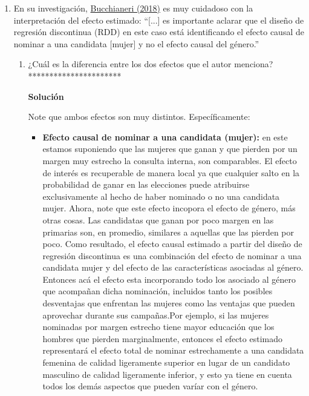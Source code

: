 \documentclass[a4paper, answers, addpoints, 11pt]{exam}
\newenvironment{solucion}{%
  \begin{mdframed}[
    backgroundcolor=blue!5,    %
    linecolor=blue!50,          %
    linewidth=2pt,              %
    leftmargin=10pt,            %
    rightmargin=8pt,           %
    topline=true,              %
    bottomline=true,            %
    roundcorner=10pt,           %
    innerleftmargin=10pt,       %
    innerrightmargin=10pt,      %
    innerbottommargin=10pt,     %
    innertopmargin=10pt         %
  ]%
  \begin{tcolorbox}[colframe=blue!50!black, colback=blue!50, coltitle=white, sharp corners=all, boxrule=1mm, width=\textwidth, halign=left, valign=center, top=0mm, bottom=0mm, left=0mm, right=0mm] \textbf{Solución} \end{tcolorbox} }{\end{mdframed}}
\begin{document}
\begin{enumerate}[resume]
\begin{enumerate}
\begin{solucion}
\end{solucion}
    \end{enumerate}
\textcolor{red}{revisar estas argumentaciones de efecto genero y de nominacion}
    \item En su investigación, \href{https://link.springer.com/article/10.1007/s11109-017-9407-7}{Bucchianeri (2018)} es muy cuidadoso con la interpretación del efecto estimado: ``[...] es importante aclarar que el diseño de regresión discontinua (RDD) en este caso está identificando el efecto causal de nominar a una candidata [mujer] y no el efecto causal del género.'' 

    \begin{enumerate}
        \item ¿Cuál es la diferencia entre los dos efectos que el autor menciona?**********************
\begin{solucion}
Note que ambos efectos son muy distintos. Específicamente:

\begin{itemize}
    \item \textbf{Efecto causal de nominar a una candidata (mujer):} en este estamos suponiendo que las mujeres que ganan  y que pierden por un margen muy estrecho la consulta interna, son comparables. El efecto de interés es recuperable de manera local ya que cualquier salto en la probabilidad de ganar en las elecciones puede atribuirse exclusivamente al hecho de haber nominado o no una candidata mujer. Ahora, note que este efecto incopora el efecto de género, más otras cosas. Las candidatas que ganan por poco margen en las primarias son, en promedio, similares a aquellas que las pierden por poco. Como resultado, el efecto causal estimado a partir del diseño de regresión discontinua es una combinación del efecto de nominar a una candidata mujer y del efecto de las características asociadas al género. Entonces acá el efecto esta incorporando todo los asociado al género que acompañan dicha nominación, incluidos tanto los posibles desventajas que enfrentan las mujeres como las ventajas que pueden aprovechar durante sus campañas.Por ejemplo,  si las mujeres nominadas por margen estrecho tiene mayor educación que los hombres que pierden marginalmente, entonces el efecto estimado representará el efecto total de nominar estrechamente a una candidata femenina de calidad ligeramente superior en lugar de un candidato masculino de calidad ligeramente inferior, y esto ya tiene en cuenta todos los demás aspectos que pueden varíar con el género.
    

\end{itemize}
\end{solucion}
\end{enumerate}
\end{enumerate}
\end{document}
